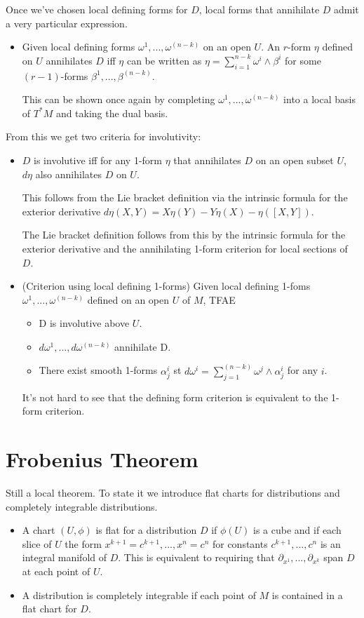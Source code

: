 \documentclass{report}
\theoremstyle{definition}
\begin{document}
Once we've chosen local defining forms for $D$, local forms that annihilate $D$ admit a very particular expression.
\begin{itemize}
    \item Given local defining forms $\omega^1,...,\omega^{(n-k)}$ on an open $U$. An $r$-form $\eta$ defined on $U$ annihilates $D$ iff $\eta$ can be written as $\eta=\sum_{i=1}^{n-k}\omega^i\wedge\beta^i$ for some $(r-1)$-forms $\beta^1,...,\beta^{(n-k)}$.

    This can be shown once again by completing $\omega^1,...,\omega^{(n-k)}$ into a local basis of $T^*M$ and taking the dual basis.
\end{itemize}

From this we get two criteria for involutivity:
\begin{itemize}
    \item $D$ is involutive iff for any 1-form $\eta$ that annihilates $D$ on an open subset $U$, $d\eta$ also annihilates $D$ on $U$.

    This follows from the Lie bracket definition via the intrinsic formula for the exterior derivative $d\eta(X,Y)=X\eta(Y)-Y\eta(X)-\eta([X,Y])$.

    The Lie bracket definition follows from this by the intrinsic formula for the exterior derivative and the annihilating 1-form criterion for local sections of $D$.
    \item (Criterion using local defining 1-forms) Given local defining 1-foms $\omega^1,...,\omega^{(n-k)}$ defined on an open $U$ of $M$, TFAE
    \begin{itemize}
        \item D is involutive above $U$.
        \item $d\omega^1,...,d\omega^{(n-k)}$ annihilate D.
        \item There exist smooth 1-forms $\alpha^i_j$ st $d\omega^i=\sum_{j=1}^{(n-k)}\omega^j\wedge\alpha^i_j$ for any $i$.
    \end{itemize}

    It's not hard to see that the defining form criterion is equivalent to the 1-form criterion.
\end{itemize}

\section{Frobenius Theorem}

Still a local theorem. To state it we introduce flat charts for distributions and completely integrable distributions.
\begin{itemize}
    \item A chart $(U,\phi)$ is flat for a distribution $D$ if $\phi(U)$ is a cube and if each slice of $U$ the form $x^{k+1}=c^{k+1},...,x^n=c^n$ for constants $c^{k+1},...,c^n$ is an integral manifold of $D$. This is equivalent to requiring that $\partial_{x^1},...,\partial_{x^k}$ span $D$ at each point of $U$.
    \item A distribution is completely integrable if each point of $M$ is contained in a flat chart for $D$.
\end{itemize}
\end{document}
